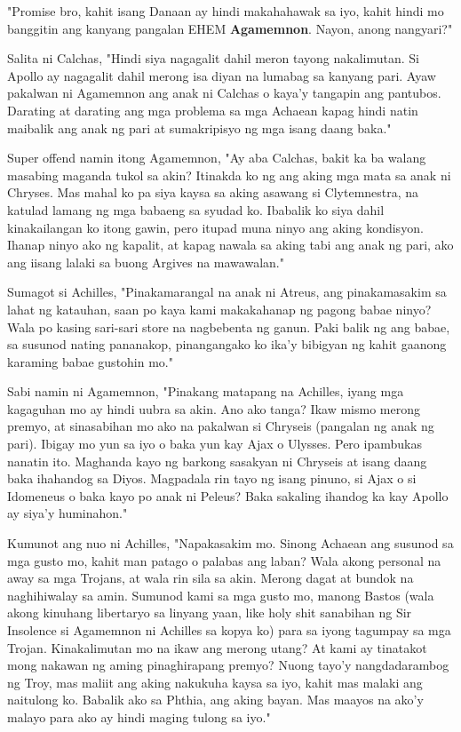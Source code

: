 \documentclass[12pt,letterpaper]{report}
\begin{document}
"Promise bro, kahit isang Danaan ay hindi makahahawak sa iyo, kahit hindi mo banggitin ang kanyang pangalan EHEM \textbf{Agamemnon}. Nayon, anong nangyari?"

Salita ni Calchas, "Hindi siya nagagalit dahil meron tayong nakalimutan. Si Apollo ay nagagalit dahil merong isa diyan na lumabag sa kanyang pari.
Ayaw pakalwan ni Agamemnon ang anak ni Calchas o kaya'y tangapin ang pantubos. Darating at darating ang mga problema sa mga Achaean kapag hindi natin maibalik ang anak ng pari at sumakripisyo ng mga isang daang baka."

Super offend namin itong Agamemnon, "Ay aba Calchas, bakit ka ba walang masabing maganda tukol sa akin?
Itinakda ko ng ang aking mga mata sa anak ni Chryses.
Mas mahal ko pa siya kaysa sa aking asawang si Clytemnestra, na katulad lamang ng mga babaeng sa syudad ko.
Ibabalik ko siya dahil kinakailangan ko itong gawin, pero itupad muna ninyo ang aking kondisyon.
Ihanap ninyo ako ng kapalit, at kapag nawala sa aking tabi ang anak ng pari,
ako ang iisang lalaki sa buong Argives na mawawalan."

Sumagot si Achilles, "Pinakamarangal na anak ni Atreus, ang pinakamasakim sa lahat ng katauhan,
saan po kaya kami makakahanap ng pagong babae ninyo? Wala po kasing sari-sari store na nagbebenta ng ganun.
Paki balik ng ang babae, sa susunod nating pananakop, pinangangako ko ika'y bibigyan ng kahit gaanong karaming babae gustohin mo."

Sabi namin ni Agamemnon, "Pinakang matapang na Achilles, iyang mga kagaguhan mo ay hindi uubra sa akin. Ano ako tanga?
Ikaw mismo merong premyo, at sinasabihan mo ako na pakalwan si Chryseis (pangalan ng anak ng pari).
Ibigay mo yun sa iyo o baka yun kay  Ajax o Ulysses. Pero ipambukas nanatin ito.
Maghanda kayo ng barkong sasakyan ni Chryseis at isang daang baka ihahandog sa Diyos. Magpadala rin tayo ng isang pinuno,
si Ajax o si Idomeneus o baka kayo po anak ni Peleus? Baka sakaling ihandog ka kay Apollo ay siya'y huminahon."

Kumunot ang nuo ni Achilles, "Napakasakim mo. Sinong Achaean ang susunod sa mga gusto mo,
kahit man patago o palabas ang laban? Wala akong personal na away sa mga Trojans, at wala rin sila sa akin.
Merong dagat at bundok na naghihiwalay sa amin. Sumunod kami sa mga gusto mo,
manong Bastos (wala akong kinuhang libertaryo sa linyang yaan,
like holy shit sanabihan ng Sir Insolence si Agamemnon ni Achilles sa kopya ko) para sa iyong tagumpay sa mga Trojan.
Kinakalimutan mo na ikaw ang merong utang? At kami ay tinatakot mong nakawan ng aming pinaghirapang premyo?
Nuong tayo'y nangdadarambog ng Troy, mas maliit ang aking nakukuha kaysa sa iyo, kahit mas malaki ang naitulong ko.
Babalik ako sa Phthia, ang aking bayan. Mas maayos na ako'y malayo para ako ay hindi maging tulong sa iyo."
\end{document}
